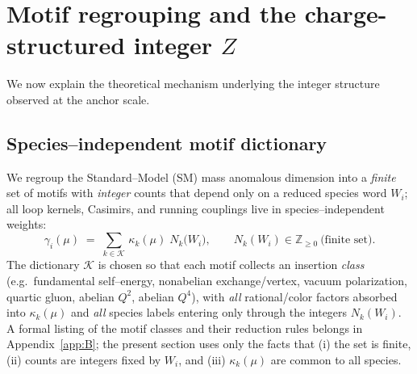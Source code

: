 \documentclass[aps,prd,onecolumn,amsmath,amssymb,superscriptaddress,nofootinbib,showpacs,showkeys]{revtex4-2}
\begin{document}



\section{Motif regrouping and the charge-structured integer \texorpdfstring{$Z$}{Z}}

We now explain the theoretical mechanism underlying the integer structure observed at the anchor scale.

\subsection{Species--independent motif dictionary}\label{sec:motif-dict}
We regroup the Standard--Model (SM) mass anomalous dimension into a \emph{finite} set of motifs with \emph{integer} counts that depend only on a reduced species word $W_i$; all loop kernels, Casimirs, and running couplings live in species--independent weights:
\begin{equation}
  \gamma_i(\mu)\;=\;\sum_{k\in\mathcal K}\,\kappa_k(\mu)\;N_k\!\bigl(W_i\bigr),
  \qquad N_k(W_i)\in\mathbb Z_{\ge0}\ \text{(finite set)}.
  \label{eq:gamma-motif}
\end{equation}
The dictionary $\mathcal K$ is chosen so that each motif collects an insertion \emph{class} (e.g.\ fundamental self--energy, nonabelian exchange/vertex, vacuum polarization, quartic gluon, abelian $Q^2$, abelian $Q^4$), with \emph{all} rational/color factors absorbed into $\kappa_k(\mu)$ and \emph{all} species labels entering only through the integers $N_k(W_i)$.
A formal listing of the motif classes and their reduction rules belongs in
Appendix~\ref{app:B}; the present section uses only the facts that (i) the set is finite, (ii) counts are integers fixed by $W_i$, and (iii) $\kappa_k(\mu)$ are common to all species.
\end{document}
